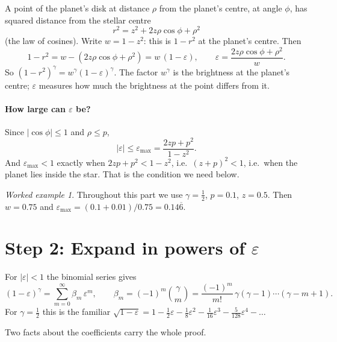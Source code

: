 \documentclass[11pt,a4paper]{article}
\theoremstyle{remark}
\newtheorem*{example}{Worked example}
\begin{document}
A point of the planet's disk at distance $\rho$ from the planet's centre, at angle $\phi$, has
squared distance from the stellar centre
\[
  r^2=z^2+2z\rho\cos\phi+\rho^2
\]
(the law of cosines). Write $w=1-z^2$: this is $1-r^2$ at the planet's centre. Then
\begin{equation}
  1-r^2=w-(2z\rho\cos\phi+\rho^2)=w\,(1-\varepsilon),\qquad
  \varepsilon=\frac{2z\rho\cos\phi+\rho^2}{w}.
  \label{eq:eps}
\end{equation}
So $(1-r^2)^\gamma=w^\gamma(1-\varepsilon)^\gamma$. The factor $w^\gamma$ is the brightness at the
planet's centre; $\varepsilon$ measures how much the brightness at the point differs from it.

\paragraph{How large can $\varepsilon$ be?} Since $|\cos\phi|\le1$ and $\rho\le p$,
\begin{equation}
  |\varepsilon|\le\varepsilon_{\max}=\frac{2zp+p^2}{1-z^2}.
  \label{eq:emax}
\end{equation}
And $\varepsilon_{\max}<1$ exactly when $2zp+p^2<1-z^2$, i.e.\ $(z+p)^2<1$, i.e.\ when the planet
lies inside the star. That is the condition we need below.

\begin{example}
Throughout this part we use $\gamma=\tfrac12$, $p=0.1$, $z=0.5$. Then $w=0.75$ and
$\varepsilon_{\max}=(0.1+0.01)/0.75=0.14\overline{6}$.
\end{example}

\section{Step 2: Expand in powers of $\varepsilon$}

For $|\varepsilon|<1$ the binomial series gives
\begin{equation}
  (1-\varepsilon)^\gamma=\sum_{m=0}^\infty\beta_m\,\varepsilon^m,\qquad
  \beta_m=(-1)^m\binom{\gamma}{m}=\frac{(-1)^m}{m!}\,\gamma(\gamma-1)\cdots(\gamma-m+1).
  \label{eq:beta}
\end{equation}
For $\gamma=\tfrac12$ this is the familiar
$\sqrt{1-\varepsilon}=1-\tfrac12\varepsilon-\tfrac18\varepsilon^2-\tfrac1{16}\varepsilon^3-\tfrac{5}{128}\varepsilon^4-\dots$

Two facts about the coefficients carry the whole proof.
\end{document}
